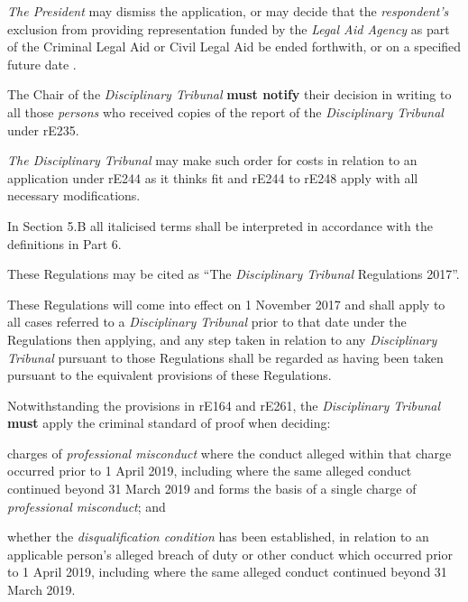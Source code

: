\par
\emph{The President} may dismiss the application, or may decide that
the \emph{respondent's} exclusion from providing representation funded
by the \emph{Legal Aid Agency} as part of the Criminal Legal Aid or
Civil Legal Aid be ended forthwith, or on a specified future date .\\
\par
The Chair of the\emph{ Disciplinary Tribunal}  \textcolor{myred}{\textbf{must notify}} their decision
in writing to all those \emph{persons} who received copies of the report
of the \emph{Disciplinary Tribunal} under rE235.\\
\par
\emph{The Disciplinary Tribunal }may make such order for costs in
relation to an application under rE244 as it thinks fit and rE244 to
rE248 apply with all necessary modifications.\\
\par
{}
In Section 5.B all italicised terms shall be interpreted in accordance
with the definitions in Part 6. \\
\par
{}
These Regulations may be cited as ``The \emph{Disciplinary
Tribunal} Regulations 2017''.\\
\par
These Regulations will come into effect on 1 November 2017 and shall
apply to all cases referred to a \emph{Disciplinary Tribunal }prior to
that date under the Regulations then applying, and any step taken in
relation to any \emph{Disciplinary Tribunal }pursuant to those
Regulations shall be regarded as having been taken pursuant to the
equivalent provisions of these Regulations.\\
\par
Notwithstanding the provisions in rE164 and rE261,
the \emph{Disciplinary Tribunal}  \textcolor{myred}{\textbf{must}} apply the criminal standard of
proof when deciding:\\\nl \item charges of \emph{professional misconduct} where the conduct alleged
within that charge occurred prior to 1 April 2019, including where the
same alleged conduct continued beyond 31 March 2019 and forms the basis
of a single charge of \emph{professional misconduct}; and\item whether the \emph{disqualification condition} has been established,
in relation to an applicable person's alleged breach of duty or other
conduct which occurred prior to 1 April 2019, including where the same
alleged conduct continued beyond 31 March 2019.\ln
{}

